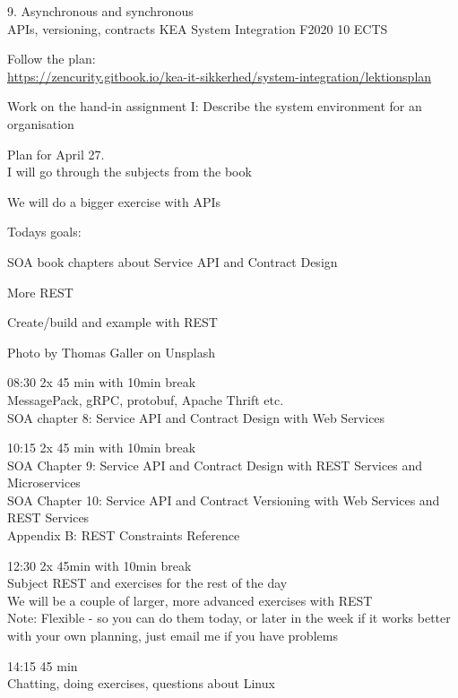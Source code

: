 \documentclass[Screen16to9,17pt]{foils}
\begin{document}
\mytitlepage
{9. Asynchronous and synchronous\\
 APIs, versioning, contracts}
{KEA System Integration F2020 10 ECTS}



\begin{list2}
\item Follow the plan:\\
\url{https://zencurity.gitbook.io/kea-it-sikkerhed/system-integration/lektionsplan}
\item Work on the hand-in assignment I: Describe the system environment for an organisation
\item Plan for April 27.\\
I will go through the subjects from the book
\item We will do a bigger exercise with APIs
\end{list2}



Todays goals:
\begin{list2}
\item SOA book chapters about Service API and Contract Design
\item More REST
\item Create/build and example with REST
\end{list2}

Photo by Thomas Galler on Unsplash


\begin{list2}
\item 08:30 2x 45 min with 10min break\\
MessagePack, gRPC, protobuf, Apache Thrift etc.\\
SOA chapter 8: Service API and Contract Design
with Web Services
\item 10:15 2x 45 min with 10min break\\
SOA Chapter 9: Service API and Contract Design with
REST Services and Microservices\\
SOA Chapter 10: Service API and Contract Versioning
with Web Services and REST Services\\
Appendix B: REST Constraints Reference
\item 12:30 2x 45min with 10min break \\
Subject REST and exercises for the rest of the day\\
We will be a couple of larger, more advanced exercises with REST\\
Note: Flexible - so you can do them today, or later in the week if it works better with your own planning, just email me if you have problems \smiley
\item 14:15 45 min\\
Chatting, doing exercises, questions about Linux
\end{list2}
\end{document}
